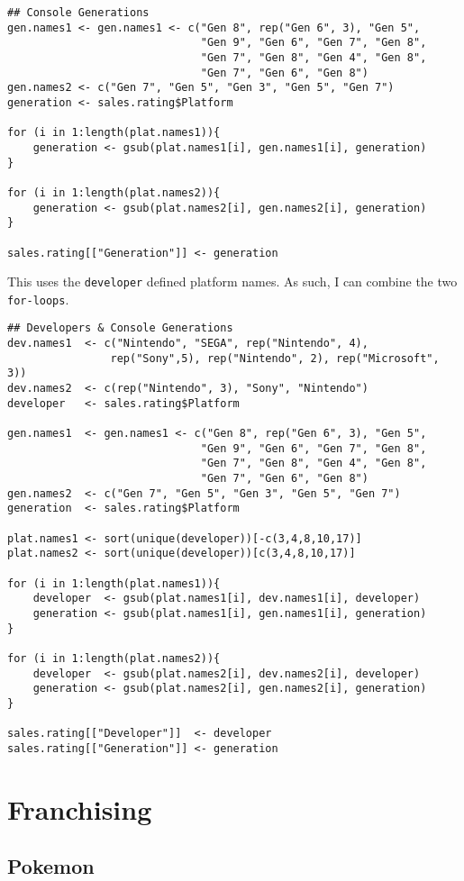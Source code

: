 \begin{verbatim}
## Console Generations
gen.names1 <- gen.names1 <- c("Gen 8", rep("Gen 6", 3), "Gen 5",
                              "Gen 9", "Gen 6", "Gen 7", "Gen 8",
                              "Gen 7", "Gen 8", "Gen 4", "Gen 8",
                              "Gen 7", "Gen 6", "Gen 8")
gen.names2 <- c("Gen 7", "Gen 5", "Gen 3", "Gen 5", "Gen 7")
generation <- sales.rating$Platform 

for (i in 1:length(plat.names1)){
    generation <- gsub(plat.names1[i], gen.names1[i], generation)
}

for (i in 1:length(plat.names2)){
    generation <- gsub(plat.names2[i], gen.names2[i], generation)
}

sales.rating[["Generation"]] <- generation
\end{verbatim}
This uses the \texttt{developer} defined platform names. As such, I can combine the two \texttt{for-loops}.

\begin{verbatim}
## Developers & Console Generations
dev.names1  <- c("Nintendo", "SEGA", rep("Nintendo", 4),
                rep("Sony",5), rep("Nintendo", 2), rep("Microsoft", 3))
dev.names2  <- c(rep("Nintendo", 3), "Sony", "Nintendo")
developer   <- sales.rating$Platform 

gen.names1  <- gen.names1 <- c("Gen 8", rep("Gen 6", 3), "Gen 5",
                              "Gen 9", "Gen 6", "Gen 7", "Gen 8",
                              "Gen 7", "Gen 8", "Gen 4", "Gen 8",
                              "Gen 7", "Gen 6", "Gen 8")
gen.names2  <- c("Gen 7", "Gen 5", "Gen 3", "Gen 5", "Gen 7")
generation  <- sales.rating$Platform 

plat.names1 <- sort(unique(developer))[-c(3,4,8,10,17)]
plat.names2 <- sort(unique(developer))[c(3,4,8,10,17)]

for (i in 1:length(plat.names1)){
    developer  <- gsub(plat.names1[i], dev.names1[i], developer)
    generation <- gsub(plat.names1[i], gen.names1[i], generation)
}

for (i in 1:length(plat.names2)){
    developer  <- gsub(plat.names2[i], dev.names2[i], developer)
    generation <- gsub(plat.names2[i], gen.names2[i], generation)
}

sales.rating[["Developer"]]  <- developer
sales.rating[["Generation"]] <- generation
\end{verbatim}

\section{Franchising}
\subsection{Pokemon}
